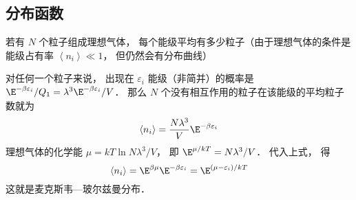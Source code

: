 \subsection{分布函数}
若有 $N$ 个粒子组成理想气体， 每个能级平均有多少粒子（由于理想气体的条件是能级占有率 $\left\langle {n_i} \right\rangle \ll 1$，  但仍然会有分布曲线）

对任何一个粒子来说， 出现在 ${\varepsilon_i}$ 能级（非简并）的概率是 ${\E^{ - \beta {\varepsilon_i}}}/{Q_1} = {\lambda ^3}{\E^{ - \beta {\varepsilon_i}}}/{V}$．  那么 $N$ 个没有相互作用的粒子在该能级的平均粒子数就为
\begin{equation}
\left\langle {n_i} \right\rangle  = \frac{N{\lambda ^3}}{V}{\E^{ - \beta {\varepsilon_i}}}
\end{equation}
理想气体的化学能 $\mu  = kT\ln {N{\lambda ^3}}/{V}$，  即 ${\E^{\mu/kT}} = {N{\lambda ^3}}/{V}$．  代入上式， 得
\begin{equation}
\left\langle {n_i} \right\rangle  = {\E^{\beta \mu }}{\E^{ - \beta {\varepsilon_i}}} = {\E^{(\mu - \varepsilon_i)/kT}}
\end{equation}
这就是麦克斯韦—玻尔兹曼分布．

